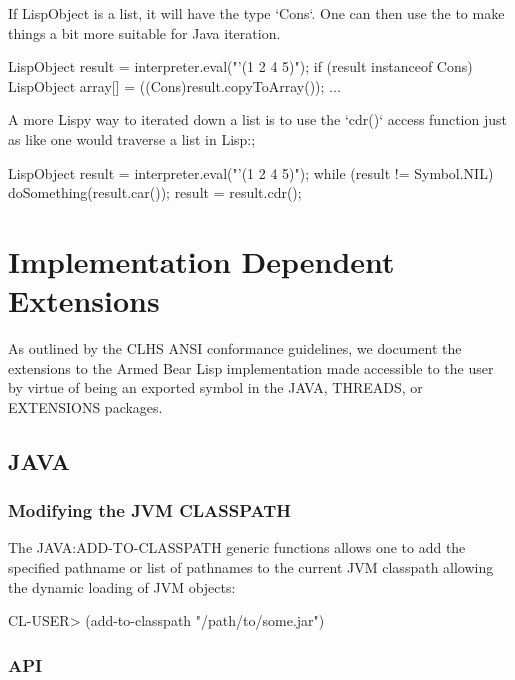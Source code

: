 \documentclass[10pt]{book}
\begin{document}
If LispObject is a list, it will have the type `Cons`.  One can then use
the  to make things a bit more suitable for Java
iteration.

\begin{listing-java}
    LispObject result = interpreter.eval("'(1 2 4 5)");
    if (result instanceof Cons) {
      LispObject array[] = ((Cons)result.copyToArray());
      ...
    }
\end{listing-java}
    
A more Lispy way to iterated down a list is to use the `cdr()` access
function just as like one would traverse a list in Lisp:;

\begin{listing-java}
    LispObject result = interpreter.eval("'(1 2 4 5)");
    while (result != Symbol.NIL) {
      doSomething(result.car());
      result = result.cdr();
    }
\end{listing-java}

\chapter{Implementation Dependent Extensions}

As outlined by the CLHS ANSI conformance guidelines, we document the
extensions to the Armed Bear Lisp implementation made accessible to
the user by virtue of being an exported symbol in the JAVA, THREADS,
or EXTENSIONS packages.

\section{JAVA}

\subsection{Modifying the JVM CLASSPATH}

The JAVA:ADD-TO-CLASSPATH generic functions allows one to add the
specified pathname or list of pathnames to the current JVM classpath
allowing the dynamic loading of JVM objects:

\begin{listing-lisp}
CL-USER> (add-to-classpath "/path/to/some.jar")
\end{listing-lisp}

\subsection{API}
\end{document}
